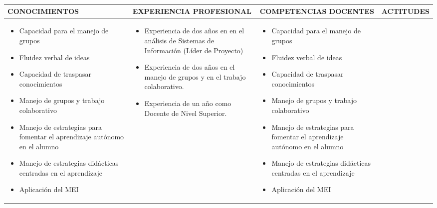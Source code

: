 \documentclass[10pt]{article}
\begin{document}
\begin{enumerate}
    \begin{tabular}{|p{}|p{}|p{}|p{}|}
      \hline
      \textbf{CONOCIMIENTOS} & \textbf{EXPERIENCIA PROFESIONAL} &\textbf{COMPETENCIAS DOCENTES} & \textbf{ACTITUDES}
      \\\hline
      \begin{itemize}[leftmargin=*]
      \setlength{\itemsep}{0pt}
      \setlength{\parskip}{0pt}
      \item Capacidad para el manejo de grupos\item Fluidez verbal de ideas\item Capacidad de traspasar conocimientos\item Manejo de grupos y trabajo colaborativo\item Manejo de estrategias para fomentar el aprendizaje autónomo en el alumno\item Manejo de estrategias didácticas centradas en el aprendizaje\item Aplicación del MEI
      \end{itemize}
      & 
      \begin{itemize}[leftmargin=*]
      \setlength{\itemsep}{0pt}
      \setlength{\parskip}{0pt}
      \item Experiencia de dos años en en el análisis de Sistemas de Información (Líder de Proyecto)\item Experiencia de dos años en el manejo de grupos y en el trabajo colaborativo.\item Experiencia de un año como Docente de Nivel Superior.
      \end{itemize}
      &
      \begin{itemize}[leftmargin=*]
      \setlength{\itemsep}{0pt}
      \setlength{\parskip}{0pt}
      \item Capacidad para el manejo de grupos\item Fluidez verbal de ideas\item Capacidad de traspasar conocimientos\item Manejo de grupos y trabajo colaborativo\item Manejo de estrategias para fomentar el aprendizaje autónomo en el alumno\item Manejo de estrategias didácticas centradas en el aprendizaje\item Aplicación del MEI

\end{itemize}
\end{tabular}
\end{enumerate}
\end{document}
